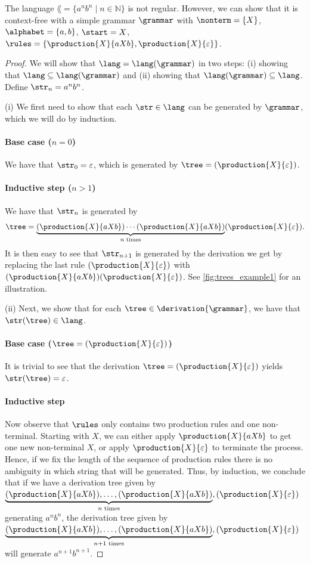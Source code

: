 \begin{example}[Recognizing $a^n b^n$]
The language $\lang=\{a^n b^n\mid n\in\mathbb N\}$ is not regular.
However, we can show that it is context-free with a simple grammar $\grammar$ with $\nonterm = \{X\}$, $\alphabet = \{a, b\}$, $\start=X$, $\rules=\{\production{X}{aXb}, \production{X}{\varepsilon}\}$.
\begin{proof}
We will show that $\lang=\lang(\grammar)$ in two steps: (i) showing that $\lang\subseteq\lang(\grammar)$ and (ii) showing that $\lang(\grammar)\subseteq\lang$. Define $\str_n=a^nb^n$.

(i) We first need to show that each $\str\in\lang$ can be generated by $\grammar$, which we will do by induction.
\paragraph{Base case ($n=0$)}
We have that $\str_0=\varepsilon$, which is generated by $\tree=(\production{X}{\varepsilon})$.
\paragraph{Inductive step ($n>1$)}
We have that $\str_n$ is generated by $$\tree=\underbrace{(\production{X}{aXb})\cdots(\production{X}{aXb})}_{n\text{ times}}(\production{X}{\varepsilon}).$$ 
It is then easy to see that $\str_{n+1}$ is generated by the derivation we get by replacing the last rule $(\production{X}{\varepsilon})$ with $(\production{X}{aXb})(\production{X}{\varepsilon})$. See \cref{fig:trees_example1} for an illustration.

(ii) Next, we show that for each $\tree\in\derivation{\grammar}$, we have that $\str(\tree)\in\lang$.
\paragraph{Base case ($\tree=(\production{X}{\varepsilon})$)}
It is trivial to see that the derivation $\tree=(\production{X}{\varepsilon})$ yields $\str(\tree)=\varepsilon$.

\paragraph{Inductive step}
Now observe that $\rules$ only contains two production rules and one non-terminal. Starting with $X$, we can either apply $\production{X}{aXb}$ to get one new non-terminal $X$, or apply $\production{X}{\varepsilon}$ to terminate the process. Hence, if we fix the length of the sequence of production rules there is no ambiguity in which string that will be generated. Thus, by induction, we conclude that if we have a derivation tree given by $\underbrace{(\production{X}{aXb}),\dots,(\production{X}{aXb})}_{n\text{ times}},(\production{X}{\varepsilon})$ generating $a^nb^n$, the derivation tree given by $\underbrace{(\production{X}{aXb}),\dots,(\production{X}{aXb})}_{n+1 \text{ times}},(\production{X}{\varepsilon})$ will generate $a^{n+1}b^{n+1}$.


\end{proof}
\end{example}
